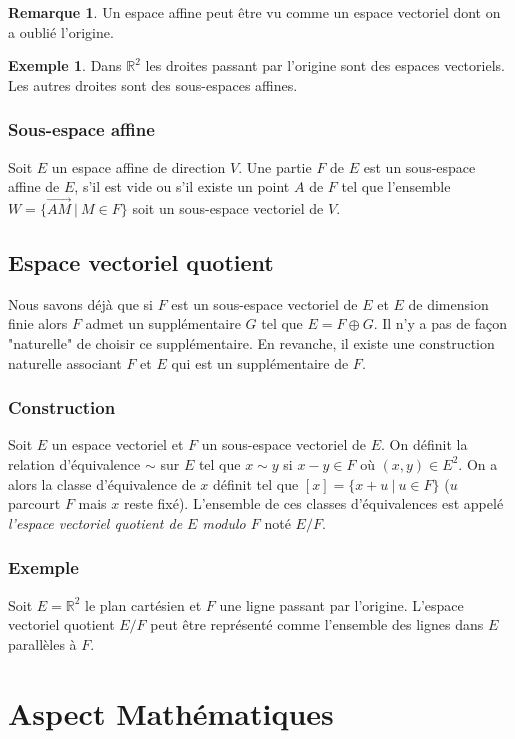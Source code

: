 \documentclass[a4paper,12pt,titlepage]{article}
\theoremstyle{plain}
\theoremstyle{definition}
\newtheorem{rmq}{Remarque}
\newtheorem{ex}{Exemple}
\begin{document}
\begin{rmq}
Un espace affine peut être vu comme un espace vectoriel dont on a oublié l'origine.
\end{rmq}
\begin{ex}
Dans $\mathbb{R}^2$ les droites passant par l'origine sont des espaces vectoriels. Les autres droites sont des sous-espaces affines. 
\end{ex}

\subsubsection{Sous-espace affine}
Soit $E$ un espace affine de direction $V$.
Une partie $F$ de $E$ est un sous-espace affine de $E$, s'il est vide ou s'il existe un point $A$ de $F$ tel que l'ensemble $W = \{ \overrightarrow{AM}~|~M \in F \}$ soit un sous-espace vectoriel de $V$.
\subsection{Espace vectoriel quotient}

Nous savons déjà que si $F$ est un sous-espace vectoriel de $E$ et $E$ de dimension finie alors $F$ admet un supplémentaire $G$ tel que $E = F \oplus G$. Il n'y a pas de façon "naturelle" de choisir ce supplémentaire. En revanche, il existe une construction naturelle associant $F$ et $E$ qui est un supplémentaire de $F$.
\subsubsection{Construction}
Soit $E$ un espace vectoriel et $F$ un sous-espace vectoriel de $E$. On définit la relation d'équivalence $\sim$ sur $E$ tel que $x \sim y$ si $x - y \in F$ où $(x,y)\in E^2$. On a alors la classe d'équivalence de $x$ définit tel que $[x] = \{x + u~|~u \in F\}$ ($u$ parcourt $F$ mais $x$ reste fixé). L'ensemble de ces classes d'équivalences est appelé \emph{l'espace vectoriel quotient de $E$ modulo $F$} noté $E/F$.
\subsubsection{Exemple}
Soit $E = \mathbb{R}^2$ le plan cartésien et $F$ une ligne passant par l'origine.
L'espace vectoriel quotient $E/F$ peut être représenté comme l'ensemble des lignes dans $E$ parallèles à $F$.
\newpage
\section{Aspect Mathématiques}
\end{document}

